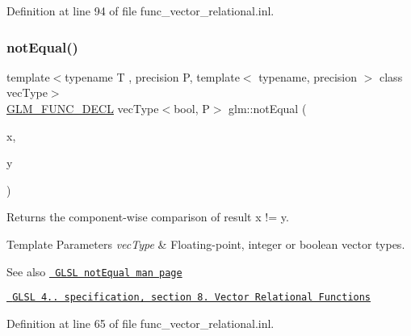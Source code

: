 Definition at line 94 of file func\+\_\+vector\+\_\+relational.\+inl.

\mbox{\label{group__core__func__vector__relational_ga5aca2b745e5eb0096716bbc394846309}} 
\subsubsection{\texorpdfstring{notEqual()}{notEqual()}}
{\footnotesize\ttfamily template$<$typename T , precision P, template$<$ typename, precision $>$ class vec\+Type$>$ \\
\mbox{\hyperlink{setup_8hpp_ab2d052de21a70539923e9bcbf6e83a51}{G\+L\+M\+\_\+\+F\+U\+N\+C\+\_\+\+D\+E\+CL}} vec\+Type$<$bool, P$>$ glm\+::not\+Equal (\begin{DoxyParamCaption}\item[{vec\+Type$<$ T, P $>$ const \&}]{x,  }\item[{vec\+Type$<$ T, P $>$ const \&}]{y }\end{DoxyParamCaption})}

Returns the component-\/wise comparison of result x != y.


\begin{DoxyTemplParams}{Template Parameters}
{\em vec\+Type} & Floating-\/point, integer or boolean vector types.\\
\hline
\end{DoxyTemplParams}
\begin{DoxySeeAlso}{See also}
\href{http://www.opengl.org/sdk/docs/manglsl/xhtml/notEqual.xml}{\texttt{ G\+L\+SL not\+Equal man page}} 

\href{http://www.opengl.org/registry/doc/GLSLangSpec.4.20.8.pdf}{\texttt{ G\+L\+SL 4.. specification, section 8. Vector Relational Functions}} 
\end{DoxySeeAlso}


Definition at line 65 of file func\+\_\+vector\+\_\+relational.\+inl.

